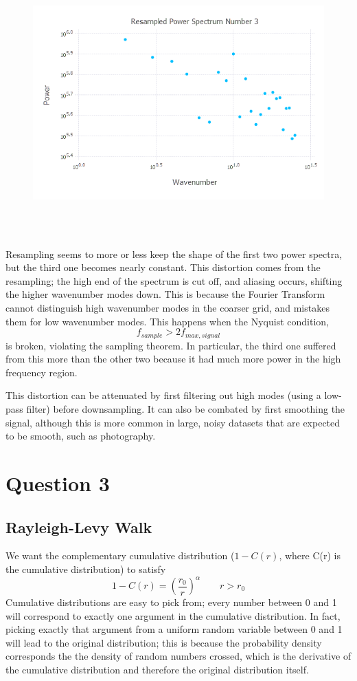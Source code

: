 \documentclass{article}
\begin{document}
\begin{figure}[H]
	\includegraphics[width=6in,height=4in]{"ps23"}
\end{figure}

Resampling seems to more or less keep the shape of the first two power spectra, but the third one becomes nearly constant. This distortion comes from the resampling; the high end of the spectrum is cut off, and aliasing occurs, shifting the higher wavenumber modes down. This is because the Fourier Transform cannot distinguish high wavenumber modes in the coarser grid, and mistakes them for low wavenumber modes. This happens when the Nyquist condition,
$$f_{sample} > 2f_{max, signal}$$
is broken, violating the sampling theorem. In particular, the third one suffered from this more than the other two because it had much more power in the high frequency region.

This distortion can be attenuated by first filtering out high modes (using a low-pass filter) before downsampling. It can also be combated by first smoothing the signal, although this is more common in large, noisy datasets that are expected to be smooth, such as photography.

\section{Question 3}
\subsection{Rayleigh-Levy Walk}
We want the complementary cumulative distribution ($1-C(r)$, where C(r) is the cumulative distribution) to satisfy
$$1 - C(r) = (\frac{r_0}{r})^\alpha \qquad r > r_0$$
Cumulative distributions are easy to pick from; every number between 0 and 1 will correspond to exactly one argument in the cumulative distribution. In fact, picking exactly that argument from a uniform random variable between 0 and 1 will lead to the original distribution; this is because the probability density corresponds the the density of random numbers crossed, which is the derivative of the cumulative distribution and therefore the original distribution itself.
\end{document}
